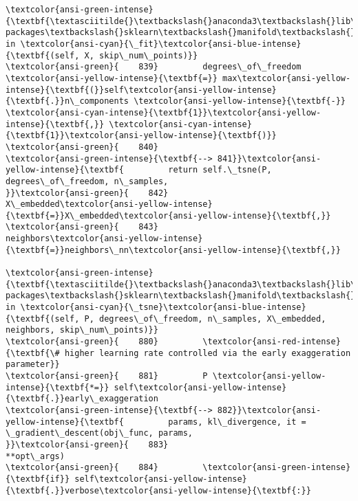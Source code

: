 \documentclass[11pt]{article}
\begin{document}
\begin{Verbatim}[commandchars=\\\{\}, frame=single, framerule=2mm, rulecolor=\color{outerrorbackground}]
\textcolor{ansi-green-intense}{\textbf{\textasciitilde{}\textbackslash{}anaconda3\textbackslash{}lib\textbackslash{}site-packages\textbackslash{}sklearn\textbackslash{}manifold\textbackslash{}\_t\_sne.py}} in \textcolor{ansi-cyan}{\_fit}\textcolor{ansi-blue-intense}{\textbf{(self, X, skip\_num\_points)}}
\textcolor{ansi-green}{    839}         degrees\_of\_freedom \textcolor{ansi-yellow-intense}{\textbf{=}} max\textcolor{ansi-yellow-intense}{\textbf{(}}self\textcolor{ansi-yellow-intense}{\textbf{.}}n\_components \textcolor{ansi-yellow-intense}{\textbf{-}} \textcolor{ansi-cyan-intense}{\textbf{1}}\textcolor{ansi-yellow-intense}{\textbf{,}} \textcolor{ansi-cyan-intense}{\textbf{1}}\textcolor{ansi-yellow-intense}{\textbf{)}}
\textcolor{ansi-green}{    840} 
\textcolor{ansi-green-intense}{\textbf{--> 841}}\textcolor{ansi-yellow-intense}{\textbf{         return self.\_tsne(P, degrees\_of\_freedom, n\_samples,
}}\textcolor{ansi-green}{    842}                           X\_embedded\textcolor{ansi-yellow-intense}{\textbf{=}}X\_embedded\textcolor{ansi-yellow-intense}{\textbf{,}}
\textcolor{ansi-green}{    843}                           neighbors\textcolor{ansi-yellow-intense}{\textbf{=}}neighbors\_nn\textcolor{ansi-yellow-intense}{\textbf{,}}

\textcolor{ansi-green-intense}{\textbf{\textasciitilde{}\textbackslash{}anaconda3\textbackslash{}lib\textbackslash{}site-packages\textbackslash{}sklearn\textbackslash{}manifold\textbackslash{}\_t\_sne.py}} in \textcolor{ansi-cyan}{\_tsne}\textcolor{ansi-blue-intense}{\textbf{(self, P, degrees\_of\_freedom, n\_samples, X\_embedded, neighbors, skip\_num\_points)}}
\textcolor{ansi-green}{    880}         \textcolor{ansi-red-intense}{\textbf{\# higher learning rate controlled via the early exaggeration parameter}}
\textcolor{ansi-green}{    881}         P \textcolor{ansi-yellow-intense}{\textbf{*=}} self\textcolor{ansi-yellow-intense}{\textbf{.}}early\_exaggeration
\textcolor{ansi-green-intense}{\textbf{--> 882}}\textcolor{ansi-yellow-intense}{\textbf{         params, kl\_divergence, it = \_gradient\_descent(obj\_func, params,
}}\textcolor{ansi-green}{    883}                                                       **opt\_args)
\textcolor{ansi-green}{    884}         \textcolor{ansi-green-intense}{\textbf{if}} self\textcolor{ansi-yellow-intense}{\textbf{.}}verbose\textcolor{ansi-yellow-intense}{\textbf{:}}


\end{Verbatim}
\end{document}
